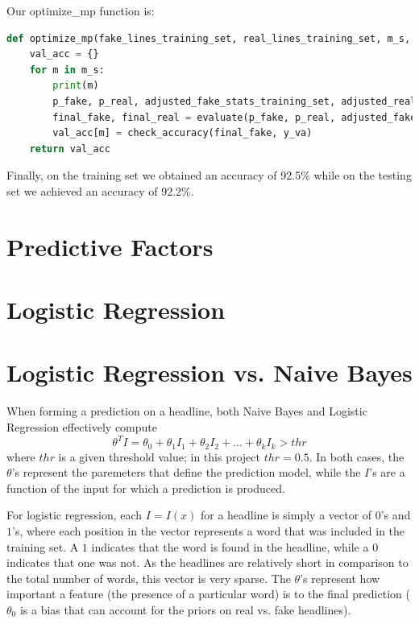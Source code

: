 \documentclass{article}
\begin{document}
Our optimize\_mp function is:
\begin{lstlisting}[language=Python]
def optimize_mp(fake_lines_training_set, real_lines_training_set, m_s, mp):
    val_acc = {}
    for m in m_s:
        print(m)
        p_fake, p_real, adjusted_fake_stats_training_set, adjusted_real_stats_training_set = training_part(fake_lines_training_set, real_lines_training_set, m, mp)
        final_fake, final_real = evaluate(p_fake, p_real, adjusted_fake_stats_training_set, adjusted_real_stats_training_set, validation_set)
        val_acc[m] = check_accuracy(final_fake, y_va)
    return val_acc

  \end{lstlisting}

Finally, on the training set we obtained an accuracy of 92.5\% while on the testing set we achieved an accuracy of 92.2\%.

   \section{Predictive Factors}




   \section{Logistic Regression}



   \section{Logistic Regression vs. Naive Bayes}
   When forming a prediction on a headline, both Naive Bayes and Logistic Regression effectively compute
   \begin{equation*}
      \theta^T I = \theta_0 + \theta_1 I_1 + \theta_2 I_2 + ... + \theta_k I_k > thr
   \end{equation*}
   where $thr$ is a given threshold value; in this project $thr = 0.5$. In both cases, the $\theta$'s represent
   the paremeters that define the prediction model, while the $I$'s are a function of the input for which a
   prediction is produced.

   For logistic regression, each $I = I(x)$ for a headline is simply a vector of $0$'s and $1$'s, where each
   position in the vector represents a word that was included in the training set. A $1$ indicates that the
   word is found in the headline, while a $0$ indicates that one was not. As the headlines are relatively short
   in comparison to the total number of words, this vector is very sparse. The $\theta$'s represent how important
   a feature (the presence of a particular word) is to the final prediction ($\theta_0$ is a bias that can
   account for the priors on real vs. fake headlines).
\end{document}
